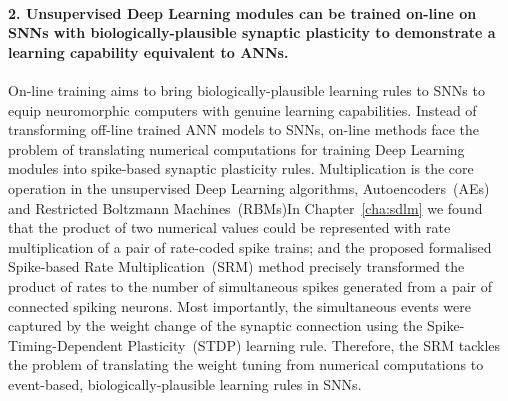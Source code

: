 \paragraph{2. Unsupervised Deep Learning modules can be trained on-line on SNNs with biologically-plausible synaptic plasticity to demonstrate a learning capability equivalent to ANNs.\\}


On-line training aims to bring biologically-plausible learning rules to SNNs to equip neuromorphic computers with genuine learning capabilities.
Instead of transforming off-line trained ANN models to SNNs, on-line methods face the problem of translating numerical computations for training Deep Learning modules into spike-based synaptic plasticity rules.
Multiplication is the core operation in the unsupervised Deep Learning algorithms, Autoencoders~(AEs) and Restricted Boltzmann Machines~(RBMs)\DIFdelbegin {}\DIFdelend \DIFaddbegin {}\DIFaddend In Chapter~\ref{cha:sdlm} we found that the product of two numerical values could be represented with rate multiplication of a pair of rate-coded spike trains;
and the proposed formalised Spike-based Rate Multiplication~(SRM) method precisely transformed the product of rates to the number of simultaneous spikes generated from a pair of connected spiking neurons.
Most importantly, the simultaneous events were captured by the weight change of the synaptic connection using the Spike-Timing-Dependent Plasticity~(STDP) learning rule.
Therefore, the SRM tackles the problem of translating the weight tuning from numerical computations to event-based, biologically-plausible learning rules in SNNs.

